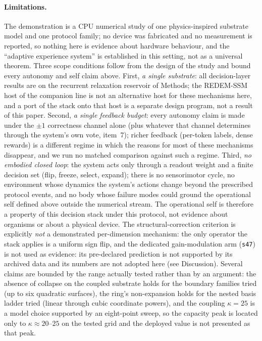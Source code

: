 \documentclass[preprint,12pt]{elsarticle}
\begin{document}
\paragraph{Limitations.} The demonstration is a CPU numerical study of one
physics-inspired substrate model and one protocol family; no device was
fabricated and no measurement is reported, so nothing here is evidence about
hardware behaviour, and the ``adaptive experience system'' is established in
this setting, not as a universal theorem. Three scope conditions follow from
the design of the study and bound every autonomy and self claim above.
First, \emph{a single substrate}: all decision-layer results are on the
recurrent relaxation reservoir of Methods; the REDEM-SSM host of the
companion line is not an alternative host for these mechanisms here, and a
port of the stack onto that host is a separate design program, not a result
of this paper. Second, \emph{a single feedback budget}: every autonomy claim
is made under the $\pm1$ correctness channel alone (plus whatever that
channel determines through the system's own vote, item~7); richer feedback
(per-token labels, dense rewards) is a different regime in which the reasons
for most of these mechanisms disappear, and we run no matched comparison
against such a regime. Third, \emph{no embodied closed loop}: the system
acts only through a readout weight and a finite decision set (flip, freeze,
select, expand); there is no sensorimotor cycle, no environment whose
dynamics the system's actions change beyond the prescribed protocol events,
and no body whose failure modes could ground the operational self defined
above outside the numerical stream. The operational self is therefore a
property of this decision stack under this protocol, not evidence about
organisms or about a physical device. The structural-correction
criterion is explicitly \emph{not} a demonstrated per-dimension mechanism:
the only operator the stack applies is a uniform sign flip, and the
dedicated gain-modulation arm (\texttt{s47}) is not used as evidence:
its pre-declared prediction is not supported by its archived data and
its numbers are not adopted here (see Discussion). Several claims are bounded by the
range actually tested rather than by an argument: the absence of collapse on
the coupled substrate holds for the boundary families tried (up to six
quadratic surfaces), the ring's non-expansion holds for the nested basis
ladder tried (linear through cubic coordinate powers), and the coupling
$\kappa=25$ is a model choice supported by an eight-point sweep, so the
capacity peak is located only to $\kappa\approx20$--$25$ on the tested grid
and the deployed value is not presented as that peak.
\end{document}
